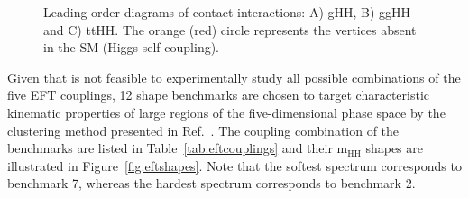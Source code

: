 \begin{figure}[htp!]
\centering
\captionsetup[subfigure]{justification=centering}
\caption[Leading order diagrams of contact interactions]{Leading order diagrams of contact interactions: A) gHH, B) ggHH and C) ttHH. The orange (red) circle represents the vertices absent in the SM (Higgs self-coupling).}
\label{fig:cinteractions}
\end{figure}

Given that is not feasible to experimentally study all possible combinations of the five EFT couplings, 12 shape benchmarks are chosen to target characteristic kinematic properties of large regions of the five-dimensional phase space by the clustering method presented in Ref.~\cite{Carvalho:2015ttv}. The coupling combination of the benchmarks are listed in Table~\ref{tab:eftcouplings} and their $\mathrm{m_{HH}}$ shapes are illustrated in Figure~\ref{fig:eftshapes}. Note that the softest spectrum corresponds to benchmark 7, whereas the hardest spectrum corresponds to benchmark 2. 

